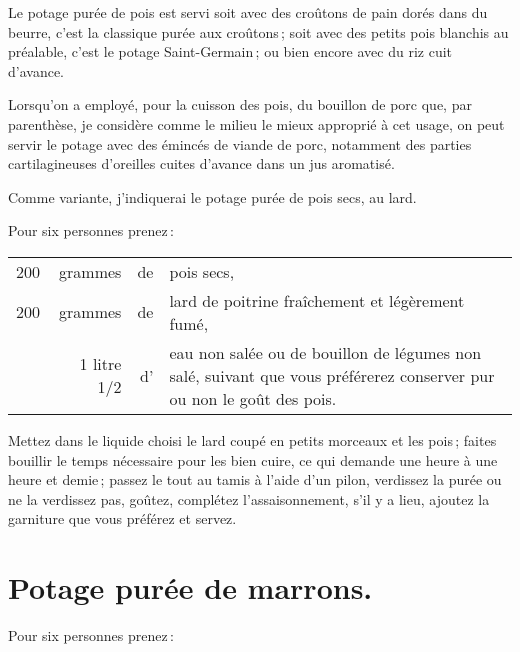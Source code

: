 Le potage purée de pois est servi soit avec des croûtons de pain dorés dans du
beurre, c'est la classique purée aux croûtons ; soit avec des petits pois
blanchis au préalable, c'est le potage Saint-Germain ; ou bien encore avec du
riz cuit d'avance.

Lorsqu'on a employé, pour la cuisson des pois, du bouillon de porc que, par
parenthèse, je considère comme le milieu le mieux approprié à cet usage, on
peut servir le potage avec des émincés de viande de porc, notamment des parties
cartilagineuses d'oreilles cuites d'avance dans un jus aromatisé.

\sk

Comme variante, j'indiquerai le potage purée de pois secs, au lard.

\medskip

Pour six personnes prenez :

\medskip

\footnotesize
\begin{longtable}{rrrp{16em}}                                                    
    200 & grammes     & de  & pois secs,                                                                  \\
    200 & grammes     & de  & lard de poitrine fraîchement et légèrement fumé,                            \\
        & 1 litre 1/2 & d'  & eau non salée ou de bouillon de légumes non salé, 
                              suivant que vous préférerez conserver pur ou non 
                              le goût des pois.                                                           \\
\end{longtable}
\normalsize

Mettez dans le liquide choisi le lard coupé en petits morceaux et les pois ;
faites bouillir le temps nécessaire pour les bien cuire, ce qui demande une
heure à une heure et demie ; passez le tout au tamis à l’aide d'un pilon,
verdissez la purée ou ne la verdissez pas, goûtez, complétez l'assaisonnement,
s'il y a lieu, ajoutez la garniture que vous préférez et servez.

\section*{\centering Potage purée de marrons.}

Pour six personnes prenez :

